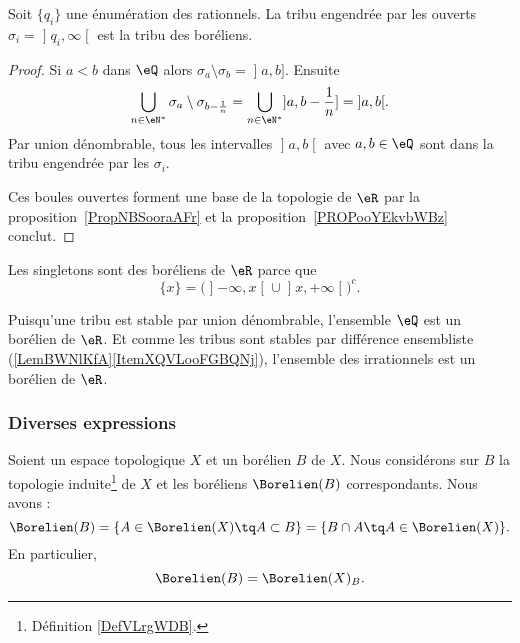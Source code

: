 \begin{lemma}   \label{LemZXnAbtl}
    Soit \( \{ q_i \}\) une énumération des rationnels. La tribu engendrée par les ouverts \( \sigma_i=\mathopen] q_i , \infty \mathclose[\) est la tribu des boréliens.
\end{lemma}

\begin{proof}
    Si \( a<b\) dans \( \eQ\) alors \( \sigma_a\setminus\sigma_b=\mathopen] a , b \mathclose]\). Ensuite
    \begin{equation}
        \bigcup_{n\in \eN^*}\sigma_a\setminus\sigma_{b-\frac{1}{ n }}=\bigcup_{n\in \eN^*}\mathopen] a , b-\frac{1}{ n } \mathclose]=\mathopen] a , b \mathclose[.
    \end{equation}
    Par union dénombrable, tous les intervalles \( \mathopen] a , b \mathclose[\) avec \( a,b\in \eQ\) sont dans la tribu engendrée par les \( \sigma_i\).

    Ces boules ouvertes forment une base de la topologie de \( \eR\) par la proposition~\ref{PropNBSooraAFr} et la proposition~\ref{PROPooYEkvbWBz} conclut.
\end{proof}

\begin{example}
    Les singletons sont des boréliens de \( \eR\) parce que
    \begin{equation}
        \{ x \}=\Big( \mathopen] -\infty , x \mathclose[\cup\mathopen] x , +\infty \mathclose[ \Big)^c.
    \end{equation}

    Puisqu'une tribu est stable par union dénombrable, l'ensemble \( \eQ\) est un borélien de \( \eR\). Et comme les tribus sont stables par différence ensembliste (\ref{LemBWNlKfA}\ref{ItemXQVLooFGBQNj}), l'ensemble des irrationnels est un borélien de \( \eR\).
\end{example}

\subsubsection{Diverses expressions}

\begin{lemma}   \label{LEMooUPYDooPVjscA}
    Soient un espace topologique \( X\) et un borélien \( B\) de \( X\). Nous considérons sur \( B\) la topologie induite\footnote{Définition \ref{DefVLrgWDB}.} de \( X\) et les boréliens \( \Borelien(B)\) correspondants. Nous avons :
    \begin{equation}
        \Borelien(B)=\{ A\in \Borelien(X)\tq A\subset B \}=\{ B\cap A\tq A\in \Borelien(X) \}.
    \end{equation}
    En particulier,
    \begin{equation}    \label{EQooEUWVooCBUims}
        \Borelien(B)=\Borelien(X)_B.
    \end{equation}
\end{lemma}

